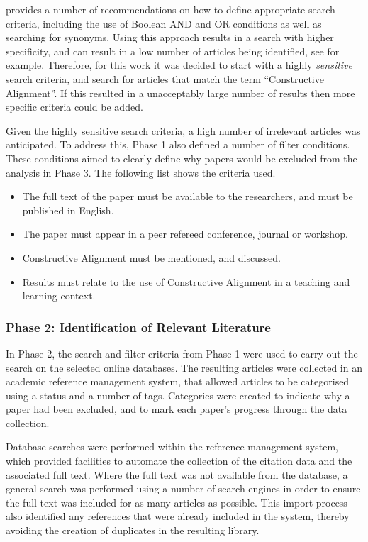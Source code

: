 \citet{Kitchenham:2004} provides a number of recommendations on how to define appropriate search criteria, including the use of Boolean AND and OR conditions as well as searching for synonyms. Using this approach results in a search with higher specificity, and can result in a low number of articles being identified, see \citet{Salleh:2011} for example. Therefore, for this work it was decided to start with a highly \emph{sensitive} search criteria, and search for articles that match the term ``Constructive Alignment''. If this resulted in a unacceptably large number of results then more specific criteria could be added.

Given the highly sensitive search criteria, a high number of irrelevant articles was anticipated. To address this, Phase 1 also defined a number of filter conditions. These conditions aimed to clearly define why papers would be excluded from the analysis in Phase 3. The following list shows the criteria used.

\begin{itemize}[noitemsep,nolistsep]
	\item The full text of the paper must be available to the researchers, and must be published in English.
	\item The paper must appear in a peer refereed conference, journal or workshop.
	\item Constructive Alignment must be mentioned, and discussed.
	\item Results must relate to the use of Constructive Alignment in a teaching and learning context.
\end{itemize}


\subsubsection{Phase 2: Identification of Relevant Literature} %
\label{ssub:identification_of_relevant_literature}

In Phase 2, the search and filter criteria from Phase 1 were used to carry out the search on the selected online databases. The resulting articles were collected in an academic reference management system, that allowed articles to be categorised using a status and a number of tags. Categories were created to indicate why a paper had been excluded, and to mark each paper's progress through the data collection. 

Database searches were performed within the reference management system, which provided facilities to automate the collection of the citation data and the associated full text. Where the full text was not available from the database, a general search was performed using a number of search engines in order to ensure the full text was included for as many articles as possible. This import process also identified any references that were already included in the system, thereby avoiding the creation of duplicates in the resulting library.

